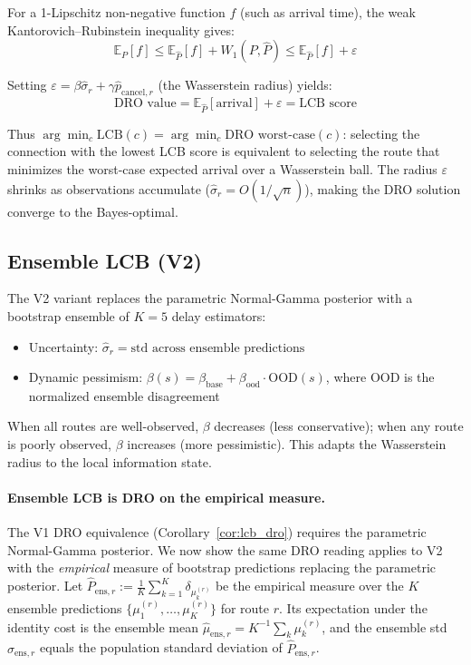 \documentclass[opre,dblanonrev]{informs4}
\begin{document}
For a 1-Lipschitz non-negative function $f$ (such as arrival time), the weak Kantorovich--Rubinstein inequality gives:
\begin{equation}
    \mathbb{E}_P[f] \leq \mathbb{E}_{\hat{P}}[f] + W_1(P, \hat{P}) \leq \mathbb{E}_{\hat{P}}[f] + \varepsilon
    \label{eq:dro_bound}
\end{equation}

Setting $\varepsilon = \beta \hat{\sigma}_r + \gamma \hat{p}_{\mathrm{cancel},r}$ (the Wasserstein radius) yields:
\begin{equation}
    \text{DRO value} = \mathbb{E}_{\hat{P}}[\text{arrival}] + \varepsilon = \text{LCB score}
    \label{eq:lcb_dro}
\end{equation}

Thus $\arg\min_c \text{LCB}(c) = \arg\min_c \text{DRO worst-case}(c)$: selecting the connection with the lowest LCB score is equivalent to selecting the route that minimizes the worst-case expected arrival over a Wasserstein ball. The radius $\varepsilon$ shrinks as observations accumulate ($\hat{\sigma}_r = O(1/\sqrt{n})$), making the DRO solution converge to the Bayes-optimal.

\subsection{Ensemble LCB (V2)}
\label{sec:ensemble}

The V2 variant replaces the parametric Normal-Gamma posterior with a bootstrap ensemble of $K{=}5$ delay estimators:
\begin{itemize}
    \item Uncertainty: $\hat{\sigma}_r = \text{std across ensemble predictions}$
    \item Dynamic pessimism: $\beta(s) = \beta_{\mathrm{base}} + \beta_{\mathrm{ood}} \cdot \text{OOD}(s)$, where OOD is the normalized ensemble disagreement
\end{itemize}
When all routes are well-observed, $\beta$ decreases (less conservative); when any route is poorly observed, $\beta$ increases (more pessimistic). This adapts the Wasserstein radius to the local information state.

\paragraph{Ensemble LCB is DRO on the empirical measure.}
The V1 DRO equivalence (Corollary~\ref{cor:lcb_dro}) requires the
parametric Normal-Gamma posterior. We now show the same DRO reading
applies to V2 with the \emph{empirical} measure of bootstrap predictions
replacing the parametric posterior. Let
$\hat{P}_{\mathrm{ens},r} := \tfrac{1}{K}\sum_{k=1}^{K}\delta_{\mu^{(r)}_k}$
be the empirical measure over the $K$ ensemble predictions
$\{\mu^{(r)}_1,\dots,\mu^{(r)}_K\}$ for route $r$.
Its expectation under the identity cost is the ensemble mean
$\hat\mu_{\mathrm{ens},r} = K^{-1}\sum_k \mu^{(r)}_k$, and the ensemble
std $\hat\sigma_{\mathrm{ens},r}$ equals the population standard
deviation of $\hat{P}_{\mathrm{ens},r}$.
\end{document}
